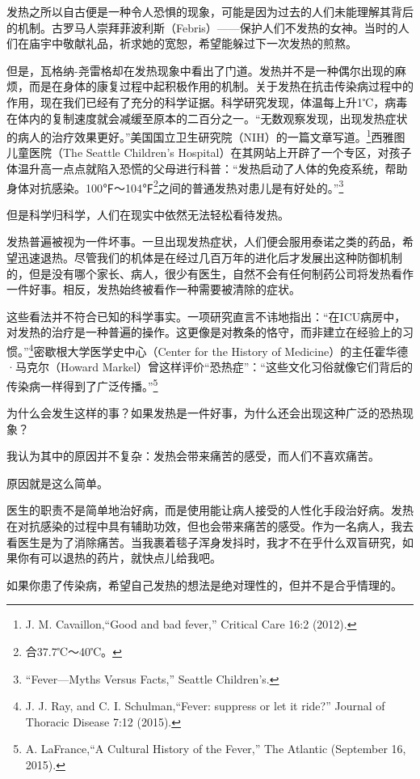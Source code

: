 发热之所以自古便是一种令人恐惧的现象，可能是因为过去的人们未能理解其背后的机制。古罗马人崇拜菲波利斯（Febris）——保护人们不发热的女神。当时的人们在庙宇中敬献礼品，祈求她的宽恕，希望能躲过下一次发热的煎熬。

但是，瓦格纳-尧雷格却在发热现象中看出了门道。发热并不是一种偶尔出现的麻烦，而是在身体的康复过程中起积极作用的机制。关于发热在抗击传染病过程中的作用，现在我们已经有了充分的科学证据。科学研究发现，体温每上升1℃，病毒在体内的复制速度就会减缓至原本的二百分之一。“无数观察发现，出现发热症状的病人的治疗效果更好。”美国国立卫生研究院（NIH）的一篇文章写道。\footnote{J. M. Cavaillon,“Good and bad fever,” Critical Care 16:2 (2012).}西雅图儿童医院（The Seattle Children’s Hospital）在其网站上开辟了一个专区，对孩子体温升高一点点就陷入恐慌的父母进行科普：“发热启动了人体的免疫系统，帮助身体对抗感染。100℉～104℉\footnote{合37.7℃～40℃。}之间的普通发热对患儿是有好处的。”\footnote{“Fever—Myths Versus Facts,” Seattle Children’s.}

但是科学归科学，人们在现实中依然无法轻松看待发热。

发热普遍被视为一件坏事。一旦出现发热症状，人们便会服用泰诺之类的药品，希望迅速退热。尽管我们的机体是在经过几百万年的进化后才发展出这种防御机制的，但是没有哪个家长、病人，很少有医生，自然不会有任何制药公司将发热看作一件好事。相反，发热始终被看作一种需要被清除的症状。

这些看法并不符合已知的科学事实。一项研究直言不讳地指出：“在ICU病房中，对发热的治疗是一种普遍的操作。这更像是对教条的恪守，而非建立在经验上的习惯。”\footnote{J. J. Ray, and C. I. Schulman,“Fever: suppress or let it ride?” Journal of Thoracic Disease 7:12 (2015).}密歇根大学医学史中心（Center for the History of Medicine）的主任霍华德·马克尔（Howard Markel）曾这样评价“恐热症”：“这些文化习俗就像它们背后的传染病一样得到了广泛传播。”\footnote{A. LaFrance,“A Cultural History of the Fever,” The Atlantic (September 16, 2015).}

为什么会发生这样的事？如果发热是一件好事，为什么还会出现这种广泛的恐热现象？

我认为其中的原因并不复杂：发热会带来痛苦的感受，而人们不喜欢痛苦。

原因就是这么简单。

医生的职责不是简单地治好病，而是使用能让病人接受的人性化手段治好病。发热在对抗感染的过程中具有辅助功效，但也会带来痛苦的感受。作为一名病人，我去看医生是为了消除痛苦。当我裹着毯子浑身发抖时，我才不在乎什么双盲研究，如果你有可以退热的药片，就快点儿给我吧。

如果你患了传染病，希望自己发热的想法是绝对理性的，但并不是合乎情理的。

